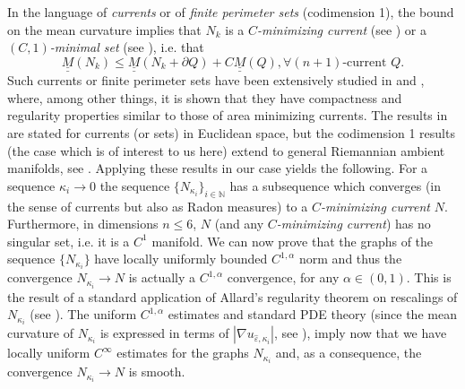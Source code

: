 \documentclass[11pt]{amsart}
\renewcommand{\epsilon}{\varepsilon}
\def\N{\mathbb{N}}
\def\a{\alpha}
\def\e{\epsilon}
\def\k{\kappa}
\def\mass{\underline{\underline{M}}}
\begin{document}
In the language of {\it currents} or of {\it finite perimeter sets} (codimension 1), the bound on the mean curvature implies that $N_k$ is a {\it $C$-minimizing current} (see \cite{DS93}) or a {\it $(C, 1)$-minimal set} (see \cite{MaMi}), i.e.  that
\[\mass(N_k)\le \mass(N_k+\partial Q)+C\mass(Q), \forall (n+1)\text{-current }Q.\]
 Such currents or finite perimeter sets  have been extensively studied  in  \cite{DS93} and \cite{MaMi}, where, among other things, it is shown that they have  compactness and regularity properties similar to those of area minimizing currents. The results in  \cite{DS93, MaMi} are stated for currents (or sets) in Euclidean space, but the codimension 1 results (the case which is of interest to us here) extend to general Riemannian ambient manifolds,  see \cite{Alex}. Applying these results in our case yields the following. For a sequence $\k_i\to 0$ the  sequence  $\{N_{\k_i}\}_{i\in \N}$ has a subsequence which converges (in the sense of currents but also as Radon measures) to a {\it$C$-minimizing current} $N$. Furthermore, in dimensions $n\le 6$, $N$ (and any  {\it $C$-minimizing current}) has no singular set, i.e. it is a $C^{1}$ manifold. We can now prove that the graphs of the sequence  $\{N_{\k_i}\}$ have locally uniformly bounded $C^{1,\a}$ norm and thus the convergence $N_{\k_i}\to N$ is actually a $C^{1,\a}$ convergence, for any $\a\in (0,1)$. This is the result of a standard application of Allard's regularity theorem \cite{Al} on rescalings of $N_{\k_i}$ (see  \cite{DS93, MaMi, Alex}). The uniform $C^{1,\a}$ estimates and standard PDE theory (since the mean curvature of $N_{\k_i}$ is expressed in terms of $|\nabla u_{\hat \e,\k_i}|$, see \cite{GT01}), imply now that we have locally uniform $C^{\infty}$ estimates for the graphs $N_{\k_i}$ and, as a consequence, the convergence $N_{\k_i}\to N$ is smooth.
\end{document}
